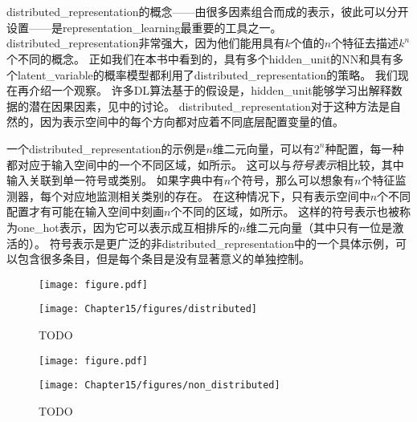 
\section{}
\label{sec:distributed_representation}
\gls{distributed_representation}的概念——由很多因素组合而成的表示，彼此可以分开设置——是\gls{representation_learning}最重要的工具之一。
\gls{distributed_representation}非常强大，因为他们能用具有$k$个值的$n$个特征去描述$k^n$个不同的概念。
正如我们在本书中看到的，具有多个\gls{hidden_unit}的\gls{NN}和具有多个\gls{latent_variable}的概率模型都利用了\gls{distributed_representation}的策略。
我们现在再介绍一个观察。
许多\gls{DL}算法基于的假设是，\gls{hidden_unit}能够学习出解释数据的潜在因果因素，见中的讨论。
\gls{distributed_representation}对于这种方法是自然的，因为表示空间中的每个方向都对应着不同底层配置变量的值。


一个\gls{distributed_representation}的示例是$n$维二元向量，可以有$2^n$种配置，每一种都对应于输入空间中的一个不同区域，如所示。
这可以与\emph{符号表示}相比较，其中输入关联到单一符号或类别。
如果字典中有$n$个符号，那么可以想象有$n$个特征监测器，每个对应地监测相关类别的存在。
在这种情况下，只有表示空间中$n$个不同配置才有可能在输入空间中刻画$n$个不同的区域，如所示。
这样的符号表示也被称为\gls{one_hot}表示，因为它可以表示成互相排斥的$n$维二元向量（其中只有一位是激活的）。
符号表示是更广泛的非\gls{distributed_representation}中的一个具体示例，可以包含很多条目，但是每个条目是没有显著意义的单独控制。

\begin{figure}[!htb]
\ifOpenSource
\centerline{\texttt{[image: figure.pdf]}}
\else
\centerline{\texttt{[image: Chapter15/figures/distributed]}}
\fi
\caption{TODO}
\label{fig:chap15_distributed}
\end{figure}

\begin{figure}[!htb]
\ifOpenSource
\centerline{\texttt{[image: figure.pdf]}}
\else
\centerline{\texttt{[image: Chapter15/figures/non\_distributed]}}
\fi
\caption{TODO}
\label{fig:chap15_nondistributed}
\end{figure}

